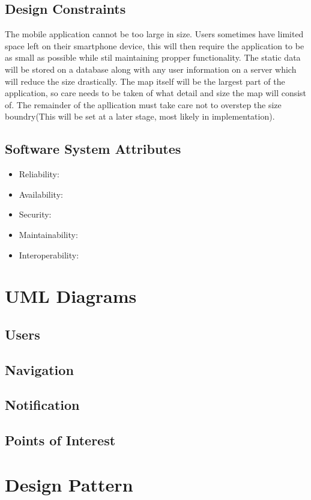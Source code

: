 \documentclass{article}
\begin{document}
	\subsection{Design Constraints}
The mobile application cannot be too large in size. Users sometimes have limited space left on their smartphone device, this will then require the application to be as small as possible while stil maintaining propper functionality. The static data will be stored on a database along with any user information on a server which will reduce the size drastically. The map itself will be the largest part of the application, so care needs to be taken of what detail and size the map will consist of. The remainder of the apllication must take care not to overstep the size boundry(This will be set at a later stage, most likely in implementation). 
	\subsection{Software System Attributes}
	\begin{itemize}
	\item Reliability:
	\item Availability:
	\item Security:
	\item Maintainability:
	\item Interoperability:
	\end{itemize}

\section{UML Diagrams}
	\subsection{Users}
	
	\subsection{Navigation}
	
	\subsection{Notification}
	
	\subsection{Points of Interest}

\section{Design Pattern}
\end{document}
